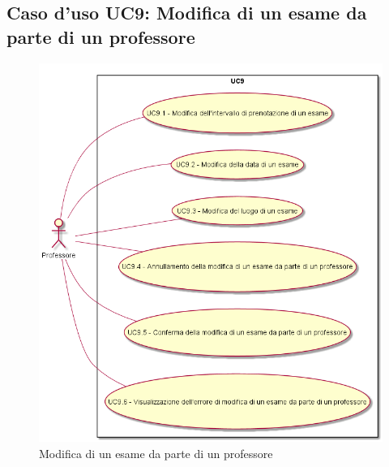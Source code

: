 \subsection{Caso d'uso \texorpdfstring{UC9}{UC9}: Modifica di un esame da parte di un professore}
\begin{figure} [H]
\centering
\includegraphics[scale=0.45]{./img/UC9.png}
\caption{Modifica di un esame da parte di un professore}\label{}
\end{figure}
